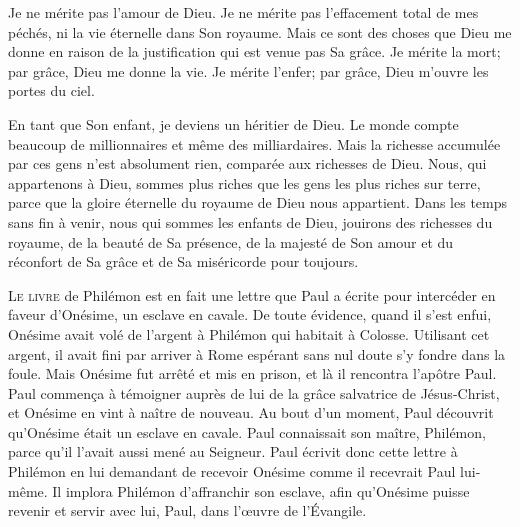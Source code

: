 
Je ne mérite pas l'amour de Dieu. Je ne mérite pas l'effacement total
 de mes péchés, ni la vie éternelle dans Son royaume.
 Mais ce sont des choses que Dieu me donne en raison de la justification
 qui est venue pas Sa grâce. Je mérite la mort; par grâce,
 Dieu me donne la vie. Je mérite l'enfer; par grâce,
 Dieu m'ouvre les portes du ciel. 

En tant que Son enfant, je deviens un héritier de Dieu.
 Le monde compte beaucoup de millionnaires et même des milliardaires.
 Mais la richesse accumulée par ces gens n'est absolument rien,
 comparée aux richesses de Dieu. Nous, qui appartenons à Dieu,
 sommes plus riches que les gens les plus riches sur terre,
 parce que la gloire éternelle du royaume de Dieu nous appartient.
 Dans les temps sans fin à venir, nous qui sommes les enfants de Dieu,
 jouirons des richesses du royaume, de la beauté de Sa présence,
 de la majesté de Son amour et du réconfort de Sa grâce
 et de Sa miséricorde \ocadr pour toujours. 

\dvrule






\lettrine{L}{e livre} de Philémon est en fait une lettre que Paul
 a écrite pour intercéder en faveur d'Onésime, un esclave en cavale.
 De toute évidence, quand il s'est enfui, Onésime avait volé de l'argent
 à Philémon qui habitait à Colosse.
 Utilisant cet argent, il avait fini par arriver à Rome
 \ocadr espérant sans nul doute s'y fondre dans la foule.
 Mais Onésime fut arrêté et mis en prison, et là il rencontra
 l'apôtre Paul. Paul commen\c{c}a à témoigner auprès de lui de la grâce
 salvatrice de Jésus-Christ, et Onésime en vint à naître de nouveau.
 Au bout d'un moment, Paul découvrit qu'Onésime était un esclave en cavale.
 Paul connaissait son maître, Philémon, parce qu'il l'avait aussi
 mené au Seigneur. Paul écrivit donc cette lettre à Philémon
 en lui demandant de recevoir Onésime comme il recevrait Paul lui-même.
 Il implora Philémon d'affranchir son esclave, afin qu'Onésime
 puisse revenir et servir avec lui, Paul, dans l'\oe{}uvre de l'Évangile.

